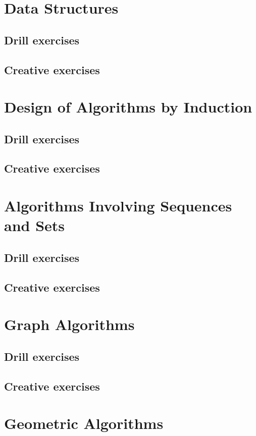 \documentclass[a4paper,11pt]{memoir}
\begin{document}
    \chapter{Data Structures}
    \section*{Drill exercises}
    \section*{Creative exercises}

    \chapter{Design of Algorithms by Induction}
    \section*{Drill exercises}
    \section*{Creative exercises}

    \chapter{Algorithms Involving Sequences and Sets}
    \section*{Drill exercises}
    \section*{Creative exercises}

    \chapter{Graph Algorithms}
    \section*{Drill exercises}
    \section*{Creative exercises}

    \chapter{Geometric Algorithms}
\end{document}
